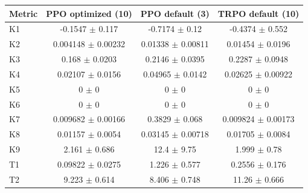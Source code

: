 \begin{tabular}{lccc}
\toprule
Metric & PPO optimized (10) & PPO default (3) & TRPO default (10) \\
\midrule
K1 & -0.1547 $\pm$ 0.117 & -0.7174 $\pm$ 0.12 & -0.4374 $\pm$ 0.552 \\
K2 & 0.004148 $\pm$ 0.00232 & 0.01338 $\pm$ 0.00811 & 0.01454 $\pm$ 0.0196 \\
K3 & 0.168 $\pm$ 0.0203 & 0.2146 $\pm$ 0.0395 & 0.2287 $\pm$ 0.0948 \\
K4 & 0.02107 $\pm$ 0.0156 & 0.04965 $\pm$ 0.0142 & 0.02625 $\pm$ 0.00922 \\
K5 & 0 $\pm$ 0 & 0 $\pm$ 0 & 0 $\pm$ 0 \\
K6 & 0 $\pm$ 0 & 0 $\pm$ 0 & 0 $\pm$ 0 \\
K7 & 0.009682 $\pm$ 0.00166 & 0.3829 $\pm$ 0.068 & 0.009824 $\pm$ 0.00173 \\
K8 & 0.01157 $\pm$ 0.0054 & 0.03145 $\pm$ 0.00718 & 0.01705 $\pm$ 0.0084 \\
K9 & 2.161 $\pm$ 0.686 & 12.4 $\pm$ 9.75 & 1.999 $\pm$ 0.78 \\
T1 & 0.09822 $\pm$ 0.0275 & 1.226 $\pm$ 0.577 & 0.2556 $\pm$ 0.176 \\
T2 & 9.223 $\pm$ 0.614 & 8.406 $\pm$ 0.748 & 11.26 $\pm$ 0.666 \\
\bottomrule
\end{tabular}
